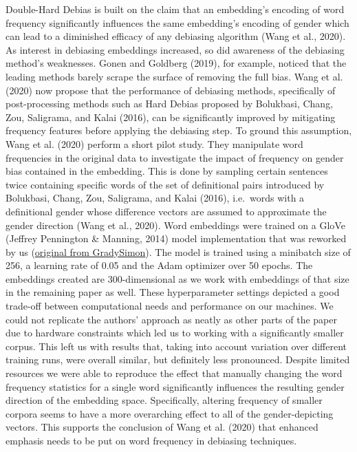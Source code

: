 \documentclass[
  english,
  man,floatsintext]{apa6}
\begin{document}
Double-Hard Debias is built on the claim that an embedding's encoding of word frequency significantly influences the same embedding's encoding of gender which can lead to a diminished efficacy of any debiasing algorithm (Wang et al., 2020). As interest in debiasing embeddings increased, so did awareness of the debiasing method's weaknesses. Gonen and Goldberg (2019), for example, noticed that the leading methods barely scrape the surface of removing the full bias. Wang et al. (2020) now propose that the performance of debiasing methods, specifically of post-processing methods such as Hard Debias proposed by Bolukbasi, Chang, Zou, Saligrama, and Kalai (2016), can be significantly improved by mitigating frequency features before applying the debiasing step.
To ground this assumption, Wang et al. (2020) perform a short pilot study. They manipulate word frequencies in the original data to investigate the impact of frequency on gender bias contained in the embedding. This is done by sampling certain sentences twice containing specific words of the set of definitional pairs introduced by Bolukbasi, Chang, Zou, Saligrama, and Kalai (2016), i.e.~words with a definitional gender whose difference vectors are assumed to approximate the gender direction (Wang et al., 2020).
Word embeddings were trained on a GloVe (Jeffrey Pennington \& Manning, 2014) model implementation that was reworked by us (\href{https://github.com/GradySimon/tensorflow-glove}{original from GradySimon}). The model is trained using a minibatch size of 256, a learning rate of 0.05 and the Adam optimizer over 50 epochs. The embeddings created are 300-dimensional as we work with embeddings of that size in the remaining paper as well. These hyperparameter settings depicted a good trade-off between computational needs and performance on our machines.
We could not replicate the authors' approach as neatly as other parts of the paper due to hardware constraints which led us to working with a significantly smaller corpus. This left us with results that, taking into account variation over different training runs, were overall similar, but definitely less pronounced.
Despite limited resources we were able to reproduce the effect that manually changing the word frequency statistics for a single word significantly influences the resulting gender direction of the embedding space. Specifically, altering frequency of smaller corpora seems to have a more overarching effect to all of the gender-depicting vectors. This supports the conclusion of Wang et al. (2020) that enhanced emphasis needs to be put on word frequency in debiasing techniques.
\end{document}
